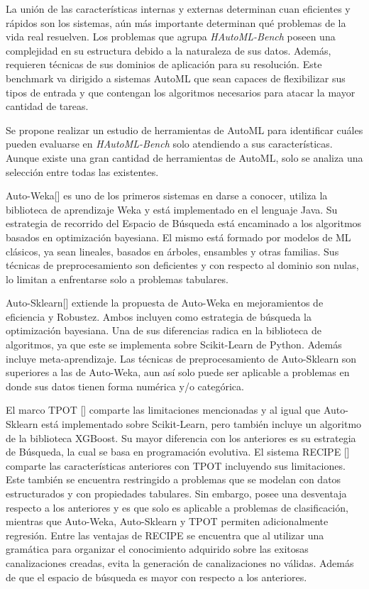 La unión de las características internas y externas determinan cuan eficientes y rápidos son los sistemas, aún más importante determinan qué problemas de la 
vida real resuelven.
Los problemas que agrupa \textit{HAutoML-Bench} poseen una complejidad en su estructura debido a la naturaleza de sus datos. Además, 
requieren técnicas de sus dominios de aplicación para su resolución. Este benchmark va dirigido a sistemas AutoML que sean capaces de flexibilizar sus tipos de entrada 
y que contengan los algoritmos necesarios para atacar la mayor cantidad de tareas. 

Se propone realizar un estudio de herramientas de AutoML para identificar cuáles pueden evaluarse en \textit{HAutoML-Bench} solo atendiendo a sus características.
Aunque existe una gran cantidad de herramientas de AutoML, solo se analiza una selección entre todas las existentes.

Auto-Weka[\cite{8}] es uno de los primeros sistemas en darse a conocer, utiliza la biblioteca de aprendizaje Weka y está implementado en el lenguaje Java. 
Su estrategia de recorrido del Espacio de Búsqueda está encaminado a los algoritmos basados en optimización bayesiana. El mismo está formado por modelos de ML 
clásicos, ya sean lineales, basados en árboles, ensambles y otras familias. Sus técnicas de preprocesamiento son deficientes y con respecto al dominio son nulas, 
lo limitan a enfrentarse solo a problemas tabulares.

Auto-Sklearn[\cite{9}] extiende la propuesta de Auto-Weka en mejoramientos de eficiencia y Robustez. Ambos incluyen como estrategia de búsqueda la optimización 
bayesiana. Una de sus diferencias radica en la biblioteca de algoritmos, ya que este se implementa sobre Scikit-Learn de Python. Además incluye meta-aprendizaje. 
Las técnicas de preprocesamiento de Auto-Sklearn son superiores a las de Auto-Weka, aun así solo puede ser aplicable a problemas en donde sus datos tienen forma 
numérica y/o categórica. 

El marco TPOT [\cite{65}] comparte las limitaciones mencionadas y al igual que Auto-Sklearn está implementado sobre Scikit-Learn, pero también incluye un algoritmo de 
la biblioteca XGBoost. Su mayor diferencia con los anteriores es su estrategia de Búsqueda, la cual se basa en programación evolutiva. 
El sistema RECIPE [\cite{64}] comparte las características anteriores con TPOT incluyendo sus limitaciones. Este también se encuentra restringido a problemas que se 
modelan con datos estructurados y con propiedades tabulares. Sin embargo, posee una desventaja respecto a los anteriores y es que solo es aplicable a problemas de 
clasificación, mientras que Auto-Weka, Auto-Sklearn y TPOT permiten adicionalmente regresión. Entre las ventajas de RECIPE se encuentra que al utilizar una 
gramática para organizar el conocimiento adquirido sobre las exitosas canalizaciones creadas, evita la generación de canalizaciones no válidas. Además de que el 
espacio de búsqueda es mayor con respecto a los anteriores.

